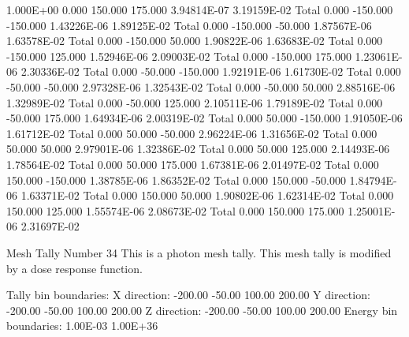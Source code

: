   1.000E+00     0.000   150.000   175.000 3.94814E-07 3.19159E-02
   Total        0.000  -150.000  -150.000 1.43226E-06 1.89125E-02
   Total        0.000  -150.000   -50.000 1.87567E-06 1.63578E-02
   Total        0.000  -150.000    50.000 1.90822E-06 1.63683E-02
   Total        0.000  -150.000   125.000 1.52946E-06 2.09003E-02
   Total        0.000  -150.000   175.000 1.23061E-06 2.30336E-02
   Total        0.000   -50.000  -150.000 1.92191E-06 1.61730E-02
   Total        0.000   -50.000   -50.000 2.97328E-06 1.32543E-02
   Total        0.000   -50.000    50.000 2.88516E-06 1.32989E-02
   Total        0.000   -50.000   125.000 2.10511E-06 1.79189E-02
   Total        0.000   -50.000   175.000 1.64934E-06 2.00319E-02
   Total        0.000    50.000  -150.000 1.91050E-06 1.61712E-02
   Total        0.000    50.000   -50.000 2.96224E-06 1.31656E-02
   Total        0.000    50.000    50.000 2.97901E-06 1.32386E-02
   Total        0.000    50.000   125.000 2.14493E-06 1.78564E-02
   Total        0.000    50.000   175.000 1.67381E-06 2.01497E-02
   Total        0.000   150.000  -150.000 1.38785E-06 1.86352E-02
   Total        0.000   150.000   -50.000 1.84794E-06 1.63371E-02
   Total        0.000   150.000    50.000 1.90802E-06 1.62314E-02
   Total        0.000   150.000   125.000 1.55574E-06 2.08673E-02
   Total        0.000   150.000   175.000 1.25001E-06 2.31697E-02

 Mesh Tally Number        34
 This is a photon mesh tally.
 This mesh tally is modified by a dose response function.

 Tally bin boundaries:
    X direction:   -200.00    -50.00    100.00    200.00
    Y direction:   -200.00    -50.00    100.00    200.00
    Z direction:   -200.00    -50.00    100.00    200.00
    Energy bin boundaries: 1.00E-03 1.00E+36

